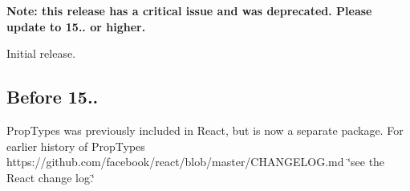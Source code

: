 {\bfseries Note\+: this release has a critical issue and was deprecated. Please update to 15.. or higher.}


\begin{DoxyItemize}
\item Initial release.
\end{DoxyItemize}

\subsection*{Before 15..}

Prop\+Types was previously included in React, but is now a separate package. For earlier history of Prop\+Types https\+://github.com/facebook/react/blob/master/\+C\+H\+A\+N\+G\+E\+L\+O\+G.\+md \char`\"{}see the React change log.\char`\"{} 